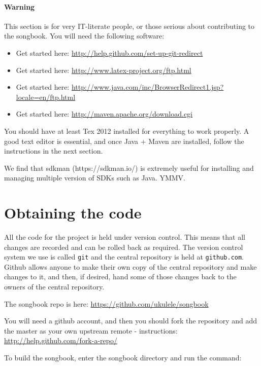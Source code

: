 \documentclass[16pt,a4paper,oneside]{book}
\newcommand{\latex}{\LaTeX\xspace}
\begin{document}
\paragraph{Warning} %
\label{par:warning}

This section is for very IT-literate people, or those serious about contributing to the songbook. You will need the following software:

\begin{itemize}
	\item[\textbf{Git}]Get started here: \url{http://help.github.com/set-up-git-redirect}
	\item[\textbf{\latex}]Get started here: \url{http://www.latex-project.org/ftp.html}
	\item[\textbf{Java}]Get started here: \url{http://www.java.com/inc/BrowserRedirect1.jsp?locale=en/ftp.html}
	\item[\textbf{Maven}]Get started here: \url{http://maven.apache.org/download.cgi}
\end{itemize}

You should have at least Tex 2012 installed for everything to work properly. A good text editor is essential, and once Java + Maven are installed, follow the instructions in the next section.

We find that sdkman (https://sdkman.io/) is extremely useful for installing and managing multiple version of SDKs such as Java. YMMV.

\section{Obtaining the code} %
\label{sec:obtaining_the_code}

All the code for the project is held under version control. This means that all changes are recorded and can be rolled back as required. The version control system we use is called \texttt{git} and the central repository is held at \texttt{github.com}. Github allows anyone to make their own copy of the central repository and make changes to it, and then, if desired, hand some of those changes back to the owners of the central repository.

The songbook repo is here: \url{https://github.com/ukulele/songbook}

You will need a github account, and then you should fork the repository and add the master as your own upstream remote - instructions: \url{http://help.github.com/fork-a-repo/}

To build the songbook, enter the songbook directory and run the command:
\end{document}
